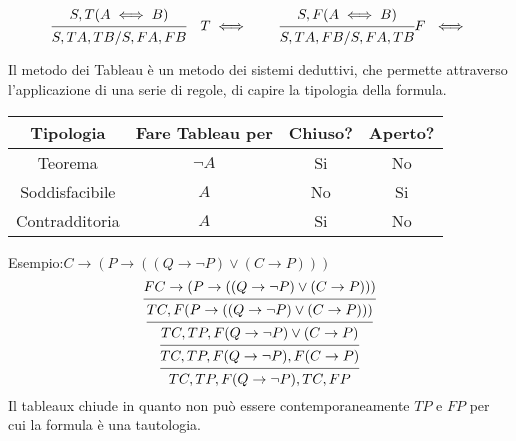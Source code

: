 \begin{equation*}
\begin{prooftree}
\hypo{S,T (A \iff B)}
\infer1 {S,TA,TB/S,FA,FB}
\end{prooftree}
\quad T \iff \qquad
\begin{prooftree}
\hypo{S,F (A \iff B)}
\infer1{S,TA,FB/S,FA,TB}
\end{prooftree}
F \ \iff
\end{equation*}

Il metodo dei Tableau è un metodo dei sistemi deduttivi, che permette attraverso
l'applicazione di una serie di regole, di capire la tipologia della formula.
\begin{tabular}{cccc}
\toprule Tipologia & Fare Tableau per & Chiuso? & Aperto? \\
\midrule
         Teorema & $\neg A$ & Si & No \\
         Soddisfacibile & $A$ & No & Si \\
         Contradditoria & $A$ & Si & No \\
\bottomrule
\end{tabular}

Esempio:$C \rightarrow (P \rightarrow ((Q \rightarrow \neg P) \lor (C \rightarrow P)))$
\begin{equation*}
\begin{prooftree}
\hypo{F C \rightarrow (P \rightarrow ((Q \rightarrow \neg P) \lor (C \rightarrow P)))}
\infer1 {TC,F (P \rightarrow ((Q \rightarrow \neg P) \lor (C \rightarrow P)))}
\infer1 {TC,TP,F (Q \rightarrow \neg P) \lor (C \rightarrow P)}
\infer1 {TC,TP,F (Q \rightarrow \neg P),F (C \rightarrow P)}
\infer1{TC,TP,F (Q \rightarrow \neg P),TC,FP}
\end{prooftree}
\end{equation*}
Il tableaux chiude in quanto non può essere contemporaneamente $TP$ e $FP$ per cui
la formula è una tautologia.

